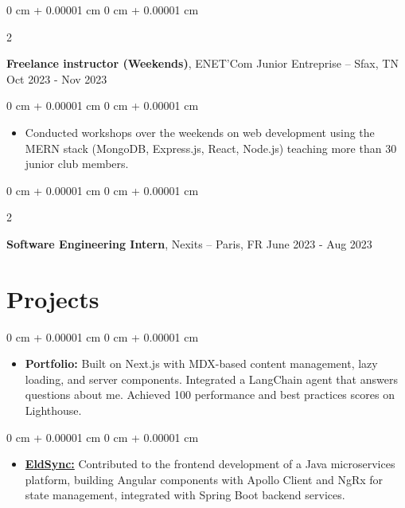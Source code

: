 \documentclass[10pt, letterpaper]{article}
\newenvironment{highlights}{
  \begin{itemize}[
    topsep=0.10 cm,
    parsep=0.10 cm,
    partopsep=0pt,
    itemsep=0pt,
    leftmargin=0 cm + 10pt
    ]
  }{
\end{itemize}
}
\newenvironment{onecolentry}{
  \begin{adjustwidth}{
      0 cm + 0.00001 cm
    }{
      0 cm + 0.00001 cm
    }
  }{
  \end{adjustwidth}
} %
\newenvironment{twocolentry}[2][]{
  \onecolentry
  \def\secondColumn{#2}
  \setcolumnwidth{\fill, 4.5 cm}
  \begin{paracol}{2}
  }{
    \switchcolumn \raggedleft \secondColumn
  \end{paracol}
  \end{onecolentry}
} %
\begin{document}
    \begin{twocolentry}{
      Oct 2023 - Nov 2023
    }
  \textbf{Freelance instructor (Weekends)}, ENET’Com Junior Entreprise  -- Sfax, TN\end{twocolentry}

  \vspace{0.10 cm}
  \begin{onecolentry}
    \begin{highlights}

    \item Conducted workshops over the weekends on web development using the MERN stack (MongoDB, Express.js, React, Node.js) teaching more than 30 junior club members.


    \end{highlights}

  \end{onecolentry}




  \begin{twocolentry}{
      June 2023 - Aug 2023
    }
  \textbf{Software Engineering Intern}, Nexits  -- Paris, FR\end{twocolentry}



\section{Projects}

\vspace{0.1 cm}
\begin{onecolentry}
  \begin{highlights}
  \item \textbf{Portfolio:} Built on Next.js with MDX-based content management, lazy loading, and server components. Integrated a LangChain agent that answers questions about me. Achieved 100 performance and best practices scores on Lighthouse.
  \end{highlights}
\end{onecolentry}

\vspace{0.1 cm}
\begin{onecolentry}
  \begin{highlights}
  \item \textbf{\href{https://ihebbelhadj.vercel.app/projects/elder_care_saas}{EldSync:}} Contributed to the frontend development of a Java microservices platform, building Angular components with Apollo Client and NgRx for state management, integrated with Spring Boot backend services.
  \end{highlights}
\end{onecolentry}
\end{document}
